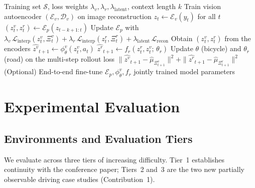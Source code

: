 \documentclass[preprint,12pt]{elsarticle}
\newcommand{\zv}{z^{v}}      %
\newcommand{\zr}{z^{r}}      %
\begin{document}
\begin{algorithm}[p]
\caption{PIWM training for partially observable driving.}
\label{alg:piwm_drive}
\begin{algorithmic}[1]
\Require Training set $\mathcal{S}$, loss weights
         $\lambda_v, \lambda_r, \lambda_{\mathrm{latent}}$, context length $k$
\State Train vision autoencoder $(\mathcal{E}_v, \mathcal{D}_v)$ on image
       reconstruction
    \State $z_t \gets \mathcal{E}_v(y_t)$ for all $t$
    \State $(\zv_t, \zr_t) \gets \mathcal{E}_p(z_{t-k+1:t})$
    \State Update $\mathcal{E}_p$ with
           $\lambda_v\,\mathcal{L}_{\mathrm{interp}}(\zv_t, \Xi^v_t)
           + \lambda_r\,\mathcal{L}_{\mathrm{interp}}(\zr_t, \Xi^r_t)
           + \lambda_{\mathrm{latent}}\,\mathcal{L}_{\mathrm{recon}}$
\EndFor
{}
    \State Obtain $(\zv_t, \zr_t)$ from the encoders
    \State $\hat{\zv}_{t+1} \gets \phi^{v}_\theta(\zv_t, a_t)$
    \State $\hat{\zr}_{t+1} \gets f_r(\zr_t, \zv_t;\,\theta_r)$
    \State Update $\theta$ (bicycle) and $\theta_r$ (road) on the multi-step
           rollout loss
           $\|\hat{\zv}_{t+1} - \hat{\mu}_{\Xi^v_{t+1}}\|^2
           + \|\hat{\zr}_{t+1} - \hat{\mu}_{\Xi^r_{t+1}}\|^2$
\EndFor
\State (Optional) End-to-end fine-tune $\mathcal{E}_p, \phi^{v}_\theta, f_r$ jointly
\State \Return trained model parameters
\end{algorithmic}
\end{algorithm}


\section{Experimental Evaluation}\label{sec:experiments}

\subsection{Environments and Evaluation Tiers}

We evaluate across three tiers of increasing difficulty.
Tier~1 establishes continuity with the conference paper; Tiers~2 and~3 are the two
new partially observable driving case studies (Contribution~1).
\end{document}
